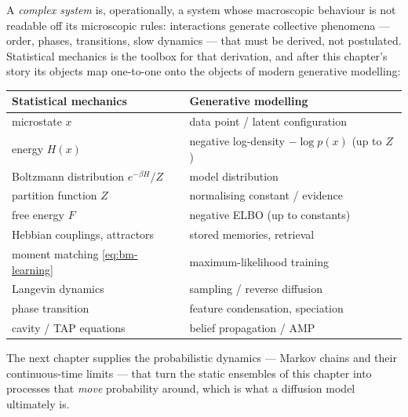 A \emph{complex system} is, operationally, a system whose macroscopic
behaviour is not readable off its microscopic rules: interactions generate
collective phenomena --- order, phases, transitions, slow dynamics --- that
must be derived, not postulated. Statistical mechanics is the toolbox for
that derivation, and after this chapter's story its objects map one-to-one
onto the objects of modern generative modelling:
\begin{center}
\begin{tabular}{ll}
\toprule
\textbf{Statistical mechanics} & \textbf{Generative modelling} \\
\midrule
microstate $x$ & data point / latent configuration \\
energy $H(x)$ & negative log-density $-\log p(x)$ (up to $Z$) \\
Boltzmann distribution $e^{-\beta H}/Z$ & model distribution \\
partition function $Z$ & normalising constant / evidence \\
free energy $F$ & negative ELBO (up to constants) \\
Hebbian couplings, attractors & stored memories, retrieval \\
moment matching \eqref{eq:bm-learning} & maximum-likelihood training \\
Langevin dynamics & sampling / reverse diffusion \\
phase transition & feature condensation, speciation \\
cavity / TAP equations & belief propagation / AMP \\
\bottomrule
\end{tabular}
\end{center}
The next chapter supplies the probabilistic dynamics --- Markov chains and
their continuous-time limits --- that turn the static ensembles of this
chapter into processes that \emph{move} probability around, which is what a
diffusion model ultimately is.
